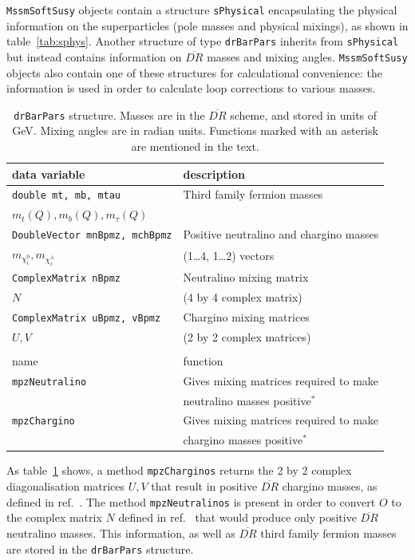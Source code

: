 \documentclass{article}
\def\code#1{\small{\tt #1}\normalsize}
\begin{document}
\code{MssmSoftSusy} objects contain a structure \code{sPhysical} encapsulating
the physical information on the superparticles (pole masses and physical
mixings), as shown in table~\ref{tab:sphys}.  
Another structure of type \code{drBarPars} inherits from \code{sPhysical} but
instead contains information on $\overline{DR}$ masses and mixing angles. 
\code{MssmSoftSusy} objects
also contain one of these structures for calculational convenience:
the information is used in order
to calculate loop corrections to various masses.
\begin{table}\begin{center}\begin{tabular}{ll} 
data variable & description \\ \hline
\code{double mt, mb, mtau} & Third family fermion masses \\
$m_t(Q), m_b(Q), m_\tau(Q)$ &                     \\ \hline
\code{DoubleVector mnBpmz, mchBpmz} & Positive neutralino and chargino masses\\
$m_{\chi_i^0}, m_{\chi^\pm_i}$ & (1\ldots4, 1\ldots2) vectors \\ \hline
\code{ComplexMatrix nBpmz} & Neutralino mixing matrix \\
$N$          & (4 by 4 complex matrix) \\ \hline
\code{ComplexMatrix uBpmz, vBpmz} & Chargino mixing matrices \\
$U, V$       & (2 by 2 complex matrices) \\ \hline
 & \\
name         & function \\ \hline
\code{mpzNeutralino} & Gives mixing matrices required to make \\ & neutralino
masses positive$^*$\\ 
\code{mpzChargino} & Gives mixing matrices required to make \\ & chargino
masses positive$^*$\\ 
\end{tabular}
\caption{\label{tab:drbarpars}\code{drBarPars} structure. Masses are in the $\overline{DR}$ scheme, and
  stored in units of GeV. Mixing angles are in radian units. Functions marked
  with an asterisk are mentioned in the text.}\end{center}\end{table}
As table~\ref{tab:drbarpars} shows, a
method \code{mpzCharginos} returns the 2 by 2 complex diagonalisation
matrices $U,V$ that result in positive $\overline{DR}$ chargino masses, as
defined in ref.~\cite{Pierce:1997zz}. 
The method
\code{mpzNeutralinos} is present in order to convert $O$ to the complex matrix
$N$ defined in ref.~\cite{Pierce:1997zz} that would produce only positive
$\overline{DR}$ neutralino masses. This information, as well as
$\overline{DR}$ third family
fermion masses are stored in the \code{drBarPars} structure.
\end{document}
